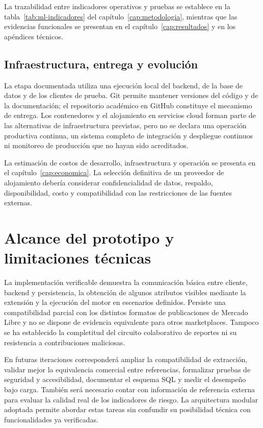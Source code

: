 La trazabilidad entre indicadores operativos y pruebas se establece en la tabla~\ref{tab:ml-indicadores} del capítulo~\ref{cap:metodologia}, mientras que las evidencias funcionales se presentan en el capítulo~\ref{cap:resultados} y en los apéndices técnicos.

\subsection{Infraestructura, entrega y evolución}\label{subsec:ml-despliegue}

La etapa documentada utiliza una ejecución local del backend, de la base de datos y de los clientes de prueba. Git permite mantener versiones del código y de la documentación; el repositorio académico en GitHub constituye el mecanismo de entrega. Los contenedores y el alojamiento en servicios cloud forman parte de las alternativas de infraestructura previstas, pero no se declara una operación productiva continua, un sistema completo de integración y despliegue continuos ni monitoreo de producción que no hayan sido acreditados.

La estimación de costos de desarrollo, infraestructura y operación se presenta en el capítulo~\ref{cap:economica}. La selección definitiva de un proveedor de alojamiento debería considerar confidencialidad de datos, respaldo, disponibilidad, costo y compatibilidad con las restricciones de las fuentes externas.

\section{Alcance del prototipo y limitaciones técnicas}\label{sec:ml-limitaciones-tecnicas}

La implementación verificable demuestra la comunicación básica entre cliente, backend y persistencia, la obtención de algunos atributos visibles mediante la extensión y la ejecución del motor en escenarios definidos. Persiste una compatibilidad parcial con los distintos formatos de publicaciones de Mercado Libre y no se dispone de evidencia equivalente para otros marketplaces. Tampoco se ha establecido la completitud del circuito colaborativo de reportes ni su resistencia a contribuciones maliciosas.

En futuras iteraciones corresponderá ampliar la compatibilidad de extracción, validar mejor la equivalencia comercial entre referencias, formalizar pruebas de seguridad y accesibilidad, documentar el esquema SQL y medir el desempeño bajo carga. También será necesario contar con información de referencia externa para evaluar la calidad real de los indicadores de riesgo. La arquitectura modular adoptada permite abordar estas tareas sin confundir su posibilidad técnica con funcionalidades ya verificadas.

